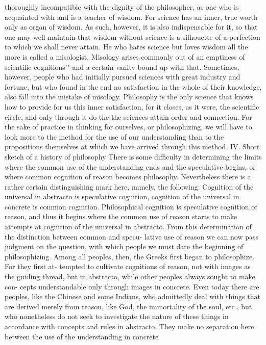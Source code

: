 thoroughly incompatible with the dignity of the philosopher, as one who is
acquainted with and is a teacher of wisdom.
For science has an inner, true worth only as organ of wisdom. As such,
however, it is also indispensable for it, so that one may well maintain that
wisdom without science is a silhouette of a perfection to which we shall
never attain.
He who hates science but loves wisdom all the more is called a
misologist. Misology arises commonly out of an emptiness of scientific
cognitions'" and a certain vanity bound up with that. Sometimes, however,
people who had initially pursued sciences with great industry and fortune,
but who found in the end no satisfaction in the whole of their knowledge,
also fall into the mistake of misology.
Philosophy is the only science that knows how to provide for us this
inner satisfaction, for it closes, as it were, the scientific circle, and only
through it do the the sciences attain order and connection.
For the sake of practice in thinking for ourselves, or philosophizing, we
will have to look more to the method for the use of our understanding than
to the propositions themselves at which we have arrived through this
method.
IV.
Short sketch of a history of philosophy
There is some difficulty in determining the limits where the common use
of the understanding ends and the speculative begins, or where common
cognition of reason becomes philosophy.
Nevertheless there is a rather certain distinguishing mark here, namely,
the following:
Cognition of the universal in abstracto is speculative cognition, cognition
of the universal in concrete is common cognition. Philosophical cognition is
speculative cognition of reason, and thus it begins where the common use
of reason starts to make attempts at cognition of the universal in abstracto.
From this determination of the distinction between common and specu-
lative use of reason we can now pass judgment on the question, with
which people we must date the beginning of philosophizing. Among all
peoples, then, the Greeks first began to philosophize. For they first at-
tempted to cultivate cognitions of reason, not with images as the guiding
thread, but in abstracto, while other peoples always sought to make con-
cepts understandable only through images in concrete. Even today there are
peoples, like the Chinese and some Indians, who admittedly deal with
things that are derived merely from reason, like God, the immortality of
the soul, etc., but who nonetheless do not seek to investigate the nature of
these things in accordance with concepts and rules in abstracto. They
make no separation here between the use of the understanding in concrete
